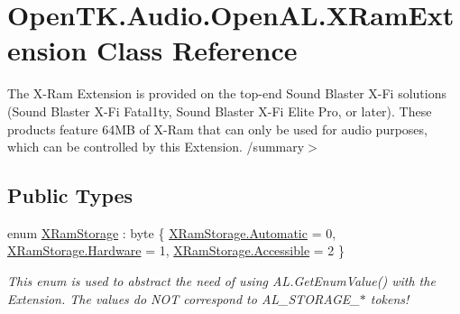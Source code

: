 \hypertarget{class_open_t_k_1_1_audio_1_1_open_a_l_1_1_x_ram_extension}{\section{Open\-T\-K.\-Audio.\-Open\-A\-L.\-X\-Ram\-Extension Class Reference}
\label{class_open_t_k_1_1_audio_1_1_open_a_l_1_1_x_ram_extension}
}


The X-\/\-Ram Extension is provided on the top-\/end Sound Blaster X-\/\-Fi solutions (Sound Blaster X-\/\-Fi Fatal1ty, Sound Blaster X-\/\-Fi Elite Pro, or later). These products feature 64\-M\-B of X-\/\-Ram that can only be used for audio purposes, which can be controlled by this Extension. /summary$>$  


\subsection*{Public Types}
\begin{DoxyCompactItemize}
\item 
enum \hyperlink{class_open_t_k_1_1_audio_1_1_open_a_l_1_1_x_ram_extension_a3803535777a75c990d24d61ac1acfd3f}{X\-Ram\-Storage} \-: byte \{ \hyperlink{class_open_t_k_1_1_audio_1_1_open_a_l_1_1_x_ram_extension_a3803535777a75c990d24d61ac1acfd3fa086247a9b57fde6eefee2a0c4752242d}{X\-Ram\-Storage.\-Automatic} = 0, 
\hyperlink{class_open_t_k_1_1_audio_1_1_open_a_l_1_1_x_ram_extension_a3803535777a75c990d24d61ac1acfd3fa3c02a379965ab0dfcd77b1c484450433}{X\-Ram\-Storage.\-Hardware} = 1, 
\hyperlink{class_open_t_k_1_1_audio_1_1_open_a_l_1_1_x_ram_extension_a3803535777a75c990d24d61ac1acfd3fab003b8bdb02a559a786c7b2c0eacde0b}{X\-Ram\-Storage.\-Accessible} = 2
 \}
\begin{DoxyCompactList}\small\item\em This enum is used to abstract the need of using A\-L.\-Get\-Enum\-Value() with the Extension. The values do N\-O\-T correspond to A\-L\-\_\-\-S\-T\-O\-R\-A\-G\-E\-\_\-$\ast$ tokens!\end{DoxyCompactList}\end{DoxyCompactItemize}
